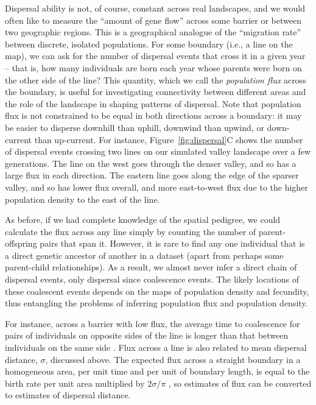 \documentclass{ar-1col}
\begin{document}
Dispersal ability is not, of course, constant across real landscapes, and
we would often like to measure the ``amount of gene flow'' across some barrier
or between two geographic regions.
This is a geographical analogue of
the ``migration rate'' between discrete, isolated populations.
For some boundary (i.e., a line on the map),
we can ask for the number of dispersal events that cross it in a given year -- 
that is, 
how many individuals are born each year whose parents
were born on the other side of the line?
This quantity, which we call the \textit{population flux} across the boundary,
is useful for investigating connectivity between different areas
and the role of the landscape in shaping patterns of dispersal.
Note that population flux is not constrained to be equal in both directions across a boundary:
it may be easier to disperse downhill than uphill,
downwind than upwind,
or down-current than up-current.
For instance, Figure~\ref{fig:dispersal}C
shows the number of dispersal events crossing two lines on our simulated valley landscape
over a few generations.
The line on the west goes through the denser valley, 
and so has a large flux in each direction.
The eastern line goes along the edge of the sparser valley,
and so has lower flux overall, and more east-to-west flux
due to the higher population density to the east of the line.

As before, if we had complete knowledge of the spatial pedigree,
we could calculate the flux across any line simply by counting the number of
parent-offspring pairs that span it.
However, it is rare to find any one individual
that is a direct genetic ancestor of another in a dataset
(apart from perhaps some parent-child relationships).
As a result, we almost never infer a direct chain of dispersal events,
only dispersal since coalescence events.
The likely locations of these coalescent events
depends on the maps of population density and fecundity,
thus entangling
the problems of inferring population flux and population density.

For instance, across a barrier with low flux,
the average time to coalescence for pairs of individuals on opposite sides of the line
is longer than that between individuals on the same side \citep{bedassle,Duforet-Frebourg_Blum_2014,ringbauer2018estimating}.
Flux across a line is also related to mean dispersal distance, $\sigma$, discussed above.
The expected flux across a straight boundary in a homogeneous area,
per unit time and per unit of boundary length,
is equal to the birth rate per unit area multiplied by $2 \sigma / \pi$
\citep{buffon1777},
so estimates of flux can be converted to estimates of dispersal distance.
\end{document}
